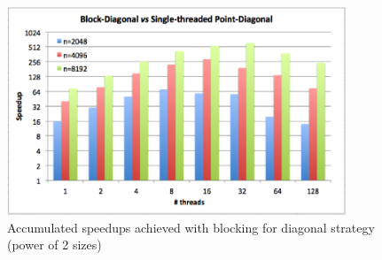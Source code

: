 \documentclass[../thesis]{subfiles}
\begin{document}
	\begin{figure}[hp]
		\begin{center}
			\includegraphics[width=0.9\textwidth]{assets/images/multicore/diagonal-block-stpoint-speedup-strange.png}
		\end{center}
		\caption{Accumulated speedups achieved with blocking for diagonal strategy (power of 2 sizes)}
		\label{fig:multicore:block:diagonal:speedup:accumulated:strange}
	\end{figure}
\end{document}
